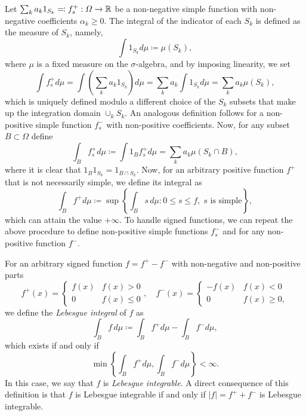 \begin{definition}
    Let $\sum_k a_k 1_{S_k} \eqqcolon f_s^+:\Omega\to \mathbb{R}$ be a non-negative simple function with non-negative coefficients $\alpha_k\geq 0$. The integral of the indicator of each $S_k$ is defined as the measure of $S_k$, namely,
    \begin{equation*}
        \int 1_{S_k}d\mu \coloneqq \mu(S_k),
    \end{equation*}
    where $\mu$ is a fixed measure on the $\sigma$-algebra, and by imposing linearity, we set
    \begin{equation*}
        \int f_s^+ d\mu = \int \left(\sum_k a_k 1_{S_k}\right) d\mu = \sum_k a_k \int 1_{S_k} d\mu = \sum_k a_k \mu(S_k),
    \end{equation*}
    which is uniquely defined modulo a different choice of the $S_k$ subsets that make up the integration domain $\cup_k S_k$. An analogous definition follows for a non-positive simple function $f_s^-$ with non-positive coefficients. Now, for any subset $B\subset \Omega$ define 
    \begin{equation*}
        \int_B f_s^+ d\mu \coloneqq \int 1_B f_s^+ d\mu = \sum_k a_k \mu(S_k \cap B),
    \end{equation*}
    where it is clear that $1_B 1_{S_k} = 1_{B \cap S_k}$. Now, for an arbitrary positive function $f^+$ that is not necessarily simple, we define its integral as 
    \begin{equation*}
        \int_B f^+ d\mu \coloneqq \sup \left\{\int_B s\,d\mu: 0\leq s\leq f,\; s\text{ is simple}\right\},
    \end{equation*}
    which can attain the value $+\infty$. To handle signed functions, we can repeat the above procedure to define non-positive simple functions $f_s^-$ and for any non-positive function $f^-$.

    For an arbitrary signed function $f=f^+ - f^-$ with non-negative and non-positive parts 
    \begin{equation*}
        f^+(x) = \begin{cases}
            f(x)& f(x)>0\\
            0 & f(x)\leq 0
        \end{cases},\quad 
        f^-(x) = \begin{cases}
            -f(x)&f(x)<0\\
            0& f(x)\geq 0,
        \end{cases}
    \end{equation*}
    we define the \emph{Lebesgue integral} of $f$ as 
    \begin{equation*}
        \int_B f\,d\mu \coloneqq \int_B f^+ d\mu - \int_B f^-d\mu,
    \end{equation*}
    which exists if and only if
    \begin{equation*}
        \min\left\{\int_B f^+d\mu, \int_B f^- d\mu\right\}<\infty.
    \end{equation*}
    In this case, we say that $f$ is \emph{Lebesgue integrable}. A direct consequence of this definition is that $f$ is Lebesgue integrable if and only if $|f|=f^+ + f^-$ is Lebesgue integrable.
\end{definition}
